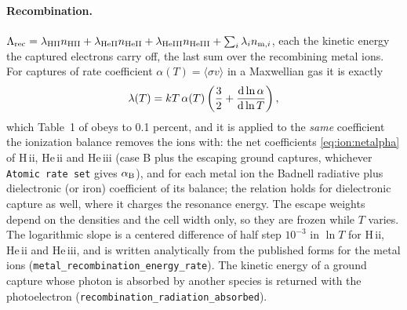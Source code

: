 \paragraph{Recombination.} $\Lambda_{\rm rec} =
\lambda_{\rm HII}n_{\rm HII}+\lambda_{\rm HeII}n_{\rm HeII}
+\lambda_{\rm HeIII}n_{\rm HeIII}+\sum_i\lambda_i n_{{\rm m},i}$, each the
kinetic energy the captured electrons carry off, the last sum over the
recombining metal ions. For captures of rate coefficient
$\alpha(T)=\langle\sigma v\rangle$ in a Maxwellian gas it is exactly
\begin{equation}
\lambda(T) = kT\,\alpha(T)\left(\frac{3}{2}
            + \frac{{\rm d}\ln\alpha}{{\rm d}\ln T}\right),
\label{eq:th:reccool}
\end{equation}
which Table~1 of \citet{Hummer1994} obeys to 0.1 percent, and it is applied
to the \emph{same} coefficient the ionization balance removes the ions with:
the net coefficients \eqref{eq:ion:netalpha} of H\,{\sc ii}, He\,{\sc ii}
and He\,{\sc iii} (case B plus the escaping ground captures, whichever
\texttt{Atomic rate set} gives $\alpha_{\rm B}$), and for each metal ion
the Badnell radiative plus dielectronic (or \citealt{Huang2023} iron)
coefficient of its balance; the relation holds for dielectronic capture as
well, where it charges the resonance energy. The escape weights depend on the
densities and the cell width only, so they are frozen while $T$ varies. The
logarithmic slope is a centered difference of half step $10^{-3}$ in $\ln T$
for H\,{\sc ii}, He\,{\sc ii} and He\,{\sc iii}, and is written analytically
from the published forms for the metal ions
(\texttt{metal\_recombination\_energy\_rate}).
The kinetic energy of a ground capture whose photon is absorbed by another
species is returned with the photoelectron
(\texttt{recombination\_radiation\_absorbed}).

